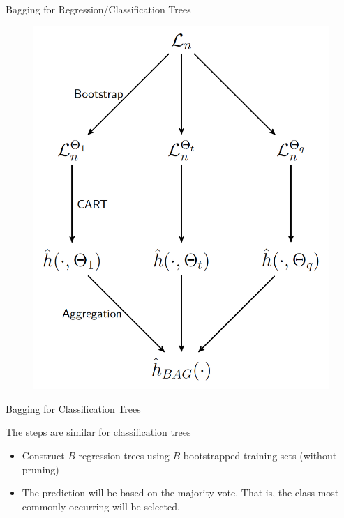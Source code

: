 \documentclass{beamer}
\begin{document}
\begin{frame}{Bagging for Regression/Classification Trees}
		 \begin{figure}[h]
		\centering
		\includegraphics[scale=0.4]{../../Figures/fig_bagging_rf.png}
	\end{figure}
	
\end{frame}

\begin{frame}{Bagging for Classification Trees}
	
	The steps are similar for classification trees
	\begin{itemize}
		\item Construct $B$ regression trees using $B$ bootstrapped training sets (without pruning)
		\item The prediction will be based on the majority vote. That is, the class most commonly occurring will be selected.
	\end{itemize}

\end{frame}
\end{document}
